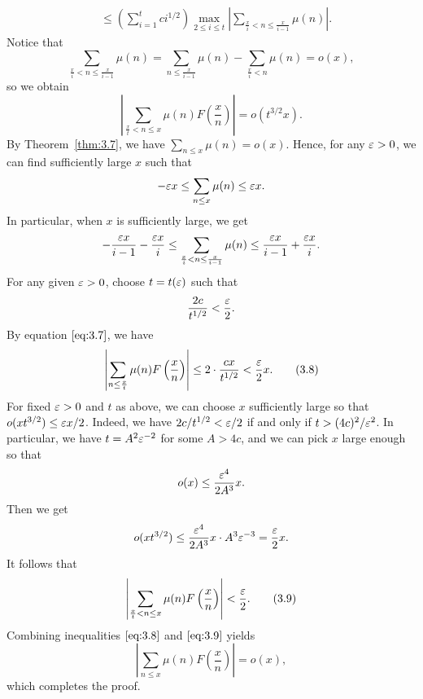 \begin{pf}
\begin{align*}
        &\leq \left( \sum_{i=1}^t ci^{1/2} \right) \max_{2\leq i \leq t} 
        \left| \sum_{\frac xi < n \leq \frac{x}{i-1}} \mu(n) \right|. 
    \end{align*}
    Notice that 
    \[ \sum_{\frac xi < n \leq \frac{x}{i-1}} \mu(n) = 
    \sum_{n \leq \frac{x}{i-1}} \mu(n) - \sum_{\frac{x}{i} < n} \mu(n) = o(x), \] 
    so we obtain 
    \[ \left| \sum_{\frac xt < n \leq x} \mu(n) F\left( \frac xn \right) \right| 
    = o(t^{3/2}x). \] 
    By Theorem~\ref{thm:3.7}, we have $\sum_{n\leq x} \mu(n) = o(x)$. Hence, 
    for any $\varepsilon > 0$, we can find sufficiently large $x$ such that 
    \[ -\varepsilon x \leq \sum_{n\leq x} \mu(n) \leq \varepsilon x. \] 
    In particular, when $x$ is sufficiently large, we get 
    \[ -\frac{\varepsilon x}{i-1} - \frac{\varepsilon x}{i} 
    \leq \sum_{\frac{x}{i} < n \leq \frac{x}{i-1}} \mu(n) 
    \leq \frac{\varepsilon x}{i-1} + \frac{\varepsilon x}{i}. \] 
    For any given $\varepsilon > 0$, choose $t = t(\varepsilon)$ such that 
    \[ \frac{2c}{t^{1/2}} < \frac{\varepsilon}2. \] 
    By equation $\eqref{eq:3.7}$, we have 
    \[ \left| \sum_{n\leq \frac{x}{t}} \mu(n) F\left( \frac xn \right) \right| 
    \leq 2 \cdot \frac{cx}{t^{1/2}} < \frac{\varepsilon}2 x. \tag{3.8}\label{eq:3.8} \] 
    For fixed $\varepsilon > 0$ and $t$ as above, we can choose $x$ sufficiently large 
    so that $o(xt^{3/2}) \leq \varepsilon x/2$. Indeed, we have 
    $2c/t^{1/2} < \varepsilon/2$ if and only if $t > (4c)^2/\varepsilon^2$. In particular, 
    we have $t = A^2\varepsilon^{-2}$ for some $A > 4c$, and we can pick $x$ large 
    enough so that 
    \[ o(x) \leq \frac{\varepsilon^4}{2A^3}x. \] 
    Then we get 
    \[ o(xt^{3/2}) \leq \frac{\varepsilon^4}{2A^3} x \cdot A^3\varepsilon^{-3} = \frac{\varepsilon}2 x. \] 
    It follows that 
    \[ \left| \sum_{\frac xt < n \leq x} \mu(n) F\left( \frac xn \right) \right| < 
    \frac{\varepsilon}2. \tag{3.9}\label{eq:3.9} \] 
    Combining inequalities $\eqref{eq:3.8}$ and $\eqref{eq:3.9}$ yields 
    \[ \left| \sum_{n\leq x} \mu(n) F\left( \frac xn \right) \right| = o(x), \] 
    which completes the proof. 
\end{pf}

